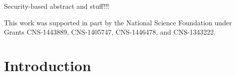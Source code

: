 \documentclass[12pt]{report}
\begin{document}
Security-based abstract and stuff!!!

\vfill

This work was supported in part by the National Science Foundation under Grants 
CNS-1443889, CNS-1405747, CNS-1446478, and CNS-1343222.

\pagebreak


\tableofcontents
\pagebreak

\listoffigures
\pagebreak

\listoftables
\pagebreak

\pagestyle{myheadings}

\chapter{Introduction}
\end{document}
